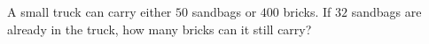 A small truck can carry either $50$ sandbags or $400$ bricks. If $32$ sandbags are already in the truck, how many bricks can it still carry?

